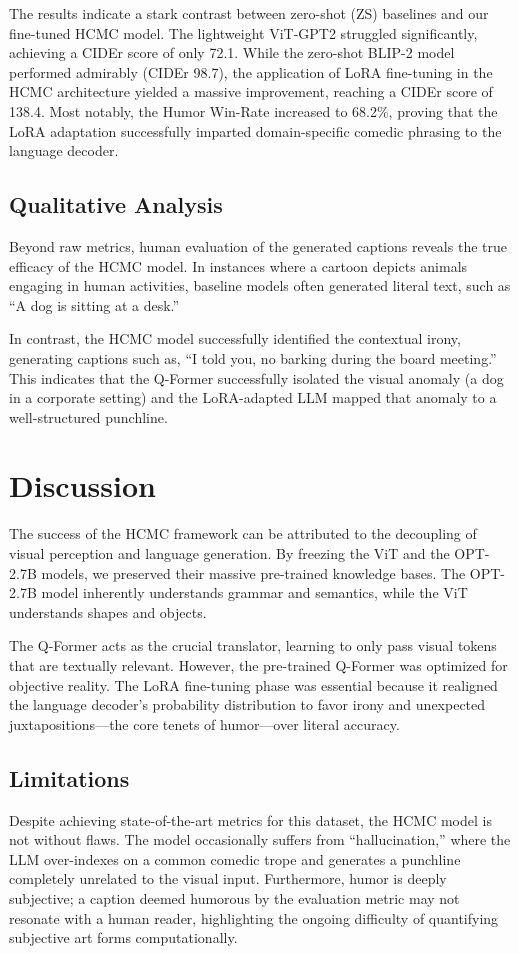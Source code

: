 \documentclass[10pt, conference, compsoc]{IEEEtran}
\begin{document}
The results indicate a stark contrast between zero-shot (ZS) baselines and our fine-tuned HCMC model. The lightweight ViT-GPT2 struggled significantly, achieving a CIDEr score of only 72.1. While the zero-shot BLIP-2 model performed admirably (CIDEr 98.7), the application of LoRA fine-tuning in the HCMC architecture yielded a massive improvement, reaching a CIDEr score of 138.4. Most notably, the Humor Win-Rate increased to 68.2\%, proving that the LoRA adaptation successfully imparted domain-specific comedic phrasing to the language decoder.

\subsection{Qualitative Analysis}
Beyond raw metrics, human evaluation of the generated captions reveals the true efficacy of the HCMC model. In instances where a cartoon depicts animals engaging in human activities, baseline models often generated literal text, such as ``A dog is sitting at a desk.'' 

In contrast, the HCMC model successfully identified the contextual irony, generating captions such as, ``I told you, no barking during the board meeting.'' This indicates that the Q-Former successfully isolated the visual anomaly (a dog in a corporate setting) and the LoRA-adapted LLM mapped that anomaly to a well-structured punchline.

\section{Discussion}
The success of the HCMC framework can be attributed to the decoupling of visual perception and language generation. By freezing the ViT and the OPT-2.7B models, we preserved their massive pre-trained knowledge bases. The OPT-2.7B model inherently understands grammar and semantics, while the ViT understands shapes and objects.

The Q-Former acts as the crucial translator, learning to only pass visual tokens that are textually relevant. However, the pre-trained Q-Former was optimized for objective reality. The LoRA fine-tuning phase was essential because it realigned the language decoder's probability distribution to favor irony and unexpected juxtapositions—the core tenets of humor—over literal accuracy.

\subsection{Limitations}
Despite achieving state-of-the-art metrics for this dataset, the HCMC model is not without flaws. The model occasionally suffers from ``hallucination,'' where the LLM over-indexes on a common comedic trope and generates a punchline completely unrelated to the visual input. Furthermore, humor is deeply subjective; a caption deemed humorous by the evaluation metric may not resonate with a human reader, highlighting the ongoing difficulty of quantifying subjective art forms computationally.
\end{document}
